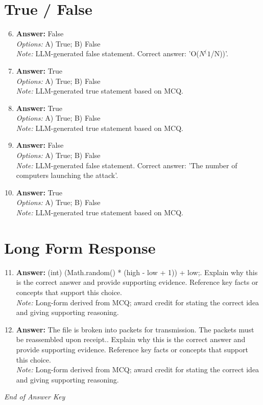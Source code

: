\documentclass[12pt]{article}
\begin{document}
\section*{True / False}
\begin{enumerate}[label=\arabic*.]
\setcounter{enumi}{5}
\item \textbf{Answer:} False
\\ \textit{Options:} A) True; B) False
\\ \textit{Note:} LLM-generated false statement. Correct answer: 'O($N^(1$/N))'.
\item \textbf{Answer:} True
\\ \textit{Options:} A) True; B) False
\\ \textit{Note:} LLM-generated true statement based on MCQ.
\item \textbf{Answer:} True
\\ \textit{Options:} A) True; B) False
\\ \textit{Note:} LLM-generated true statement based on MCQ.
\item \textbf{Answer:} False
\\ \textit{Options:} A) True; B) False
\\ \textit{Note:} LLM-generated false statement. Correct answer: 'The number of computers launching the attack'.
\item \textbf{Answer:} True
\\ \textit{Options:} A) True; B) False
\\ \textit{Note:} LLM-generated true statement based on MCQ.
\end{enumerate}

\section*{Long Form Response}
\begin{enumerate}[label=\arabic*.]
\setcounter{enumi}{10}
\item \textbf{Answer:} (int) (Math.random() * (high - low + 1)) + low;. Explain why this is the correct answer and provide supporting evidence. Reference key facts or concepts that support this choice.
\\ \textit{Note:} Long-form derived from MCQ; award credit for stating the correct idea and giving supporting reasoning.
\item \textbf{Answer:} The file is broken into packets for transmission. The packets must be reassembled upon receipt.. Explain why this is the correct answer and provide supporting evidence. Reference key facts or concepts that support this choice.
\\ \textit{Note:} Long-form derived from MCQ; award credit for stating the correct idea and giving supporting reasoning.
\end{enumerate}

\vfill
\noindent\textit{End of Answer Key}
\end{document}
